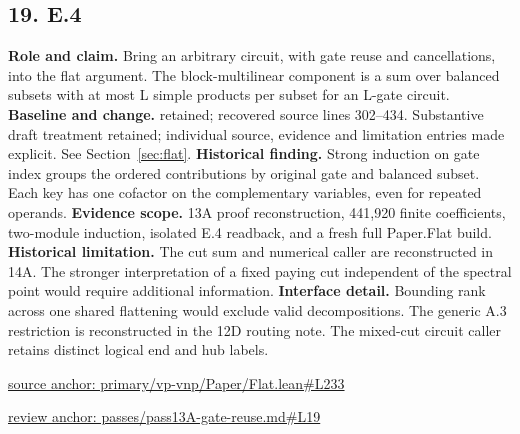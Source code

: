 \documentclass[11pt,letterpaper]{article}
\theoremstyle{definition}\newtheorem{definition}[theorem]{Definition}\newtheorem{example}[theorem]{Example}
\theoremstyle{remark}\newtheorem{remark}[theorem]{Remark}
\begin{document}
\subsection*{19. E.4}
\textbf{Role and claim.} Bring an arbitrary circuit, with gate reuse and cancellations, into the flat argument. The block-multilinear component is a sum over balanced subsets with at most L simple products per subset for an L-gate circuit.
\textbf{Baseline and change.} retained; recovered source lines 302--434. Substantive draft treatment retained; individual source, evidence and limitation entries made explicit. See Section~\ref{sec:flat}.
\textbf{Historical finding.} Strong induction on gate index groups the ordered contributions by original gate and balanced subset. Each key has one cofactor on the complementary variables, even for repeated operands.
\textbf{Evidence scope.} 13A proof reconstruction, 441,920 finite coefficients, two-module induction, isolated E.4 readback, and a fresh full Paper.Flat build.
\textbf{Historical limitation.} The cut sum and numerical caller are reconstructed in 14A. The stronger interpretation of a fixed paying cut independent of the spectral point would require additional information.
\textbf{Interface detail.} Bounding rank across one shared flattening would exclude valid decompositions. The generic A.3 restriction is reconstructed in the 12D routing note. The mixed-cut circuit caller retains distinct logical end and hub labels.
\par\href{https://github.com/nousentllc/VP-VNP-Review/blob/8a7976933b6b2b4ffda1ad3a0dfb5fc6b6f023e8/primary/vp-vnp/Paper/Flat.lean\#L233}{source anchor: primary/vp-vnp/Paper/Flat.lean\#L233}
\par\href{https://github.com/nousentllc/VP-VNP-Review/blob/8a7976933b6b2b4ffda1ad3a0dfb5fc6b6f023e8/passes/pass13A-gate-reuse.md\#L19}{review anchor: passes/pass13A-gate-reuse.md\#L19}
\goodbreak
\end{document}
